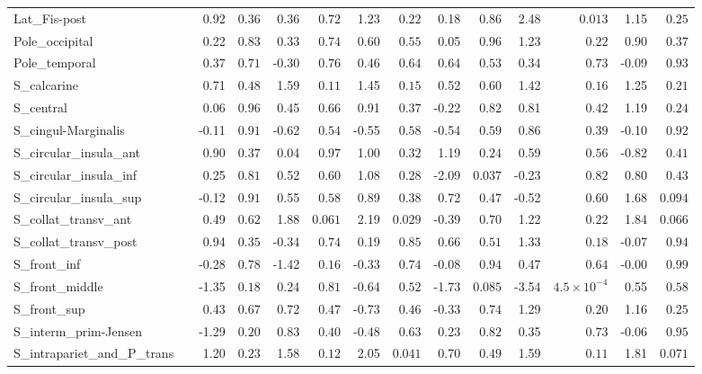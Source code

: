 {\begin{longtable}{llrrrrrrrrrrrr}
Lat\_Fis-post &  & 0.92 & $0.36$ & 0.36 & $0.72$ & 1.23 & $0.22$ & 0.18 & $0.86$ & 2.48 & $0.013$ & 1.15 & $0.25$ \\
Pole\_occipital &  & 0.22 & $0.83$ & 0.33 & $0.74$ & 0.60 & $0.55$ & 0.05 & $0.96$ & 1.23 & $0.22$ & 0.90 & $0.37$ \\
Pole\_temporal &  & 0.37 & $0.71$ & -0.30 & $0.76$ & 0.46 & $0.64$ & 0.64 & $0.53$ & 0.34 & $0.73$ & -0.09 & $0.93$ \\
S\_calcarine &  & 0.71 & $0.48$ & 1.59 & $0.11$ & 1.45 & $0.15$ & 0.52 & $0.60$ & 1.42 & $0.16$ & 1.25 & $0.21$ \\
S\_central &  & 0.06 & $0.96$ & 0.45 & $0.66$ & 0.91 & $0.37$ & -0.22 & $0.82$ & 0.81 & $0.42$ & 1.19 & $0.24$ \\
S\_cingul-Marginalis &  & -0.11 & $0.91$ & -0.62 & $0.54$ & -0.55 & $0.58$ & -0.54 & $0.59$ & 0.86 & $0.39$ & -0.10 & $0.92$ \\
S\_circular\_insula\_ant &  & 0.90 & $0.37$ & 0.04 & $0.97$ & 1.00 & $0.32$ & 1.19 & $0.24$ & 0.59 & $0.56$ & -0.82 & $0.41$ \\
S\_circular\_insula\_inf &  & 0.25 & $0.81$ & 0.52 & $0.60$ & 1.08 & $0.28$ & -2.09 & $0.037$ & -0.23 & $0.82$ & 0.80 & $0.43$ \\
S\_circular\_insula\_sup &  & -0.12 & $0.91$ & 0.55 & $0.58$ & 0.89 & $0.38$ & 0.72 & $0.47$ & -0.52 & $0.60$ & 1.68 & $0.094$ \\
S\_collat\_transv\_ant &  & 0.49 & $0.62$ & 1.88 & $0.061$ & 2.19 & $0.029$ & -0.39 & $0.70$ & 1.22 & $0.22$ & 1.84 & $0.066$ \\
S\_collat\_transv\_post &  & 0.94 & $0.35$ & -0.34 & $0.74$ & 0.19 & $0.85$ & 0.66 & $0.51$ & 1.33 & $0.18$ & -0.07 & $0.94$ \\
S\_front\_inf &  & -0.28 & $0.78$ & -1.42 & $0.16$ & -0.33 & $0.74$ & -0.08 & $0.94$ & 0.47 & $0.64$ & -0.00 & $0.99$ \\
S\_front\_middle &  & -1.35 & $0.18$ & 0.24 & $0.81$ & -0.64 & $0.52$ & -1.73 & $0.085$ & -3.54 & $4.5{\times}10^{-4}$ & 0.55 & $0.58$ \\
S\_front\_sup &  & 0.43 & $0.67$ & 0.72 & $0.47$ & -0.73 & $0.46$ & -0.33 & $0.74$ & 1.29 & $0.20$ & 1.16 & $0.25$ \\
S\_interm\_prim-Jensen &  & -1.29 & $0.20$ & 0.83 & $0.40$ & -0.48 & $0.63$ & 0.23 & $0.82$ & 0.35 & $0.73$ & -0.06 & $0.95$ \\
S\_intrapariet\_and\_P\_trans &  & 1.20 & $0.23$ & 1.58 & $0.12$ & 2.05 & $0.041$ & 0.70 & $0.49$ & 1.59 & $0.11$ & 1.81 & $0.071$ \\

\end{longtable}}
